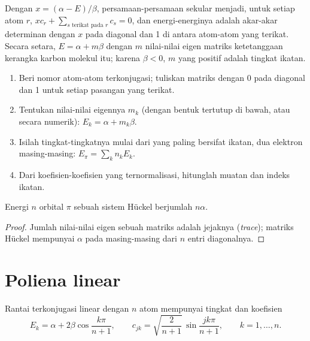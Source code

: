 Dengan $x = (\alpha - E)/\beta$, persamaan-persamaan sekular menjadi, untuk
setiap atom $r$, $xc_r + \sum_{s \text{ terikat pada } r} c_s = 0$, dan
energi-energinya adalah akar-akar determinan dengan $x$ pada diagonal dan
1 di antara atom-atom yang terikat. Secara setara, $E =
\alpha + m\beta$
dengan $m$ nilai-nilai eigen matriks ketetanggaan kerangka karbon molekul
itu; karena $\beta < 0$, $m$ yang positif adalah tingkat ikatan.

\begin{method}\label{met:b2:huckel:huckel}
\begin{enumerate}
  \item Beri nomor atom-atom terkonjugasi; tuliskan matriks dengan 0 pada
        diagonal dan 1 untuk setiap pasangan yang terikat.
  \item Tentukan nilai-nilai eigennya $m_k$ (dengan bentuk tertutup di
        bawah, atau secara numerik): $E_k =
        \alpha + m_k\beta$.
  \item Isilah tingkat-tingkatnya mulai dari yang paling bersifat ikatan,
        dua elektron masing-masing: $E_\pi = \sum_k n_k E_k$.
  \item Dari koefisien-koefisien yang ternormalisasi, hitunglah muatan dan
        indeks ikatan.
\end{enumerate}
\end{method}

\begin{proposition}\label{prop:b2:huckel:trace}
Energi $n$ orbital $\pi$ sebuah sistem Hückel berjumlah $n\alpha$.
\end{proposition}

\begin{proof}
Jumlah nilai-nilai eigen sebuah matriks adalah jejaknya (\textit{trace}); matriks Hückel
mempunyai $\alpha$ pada masing-masing dari $n$ entri diagonalnya.
\end{proof}

\section{Poliena linear}

\begin{theorem}\label{thm:b2:huckel:polyene}
Rantai terkonjugasi linear dengan $n$ atom mempunyai tingkat dan koefisien
\[
  E_k = \alpha + 2\beta\cos\frac{k\pi}{n + 1}, \qquad
  c_{jk} = \sqrt{\frac{2}{n + 1}}\,\sin\frac{jk\pi}{n + 1}, \qquad k = 1, \dots, n .
\]
\end{theorem}


